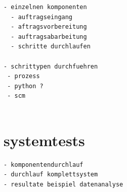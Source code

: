 \begin{verbatim}
- einzelnen komponenten
  - auftragseingang
  - aftragsvorbereitung
  - auftragsabarbeitung
  - schritte durchlaufen

- schrittypen durchfuehren
 - prozess
 - python ?
 - scm


\end{verbatim}

\section{systemtests}

\begin{verbatim}
- komponentendurchlauf
- durchlauf komplettsystem
- resultate beispiel datenanalyse

\end{verbatim}

